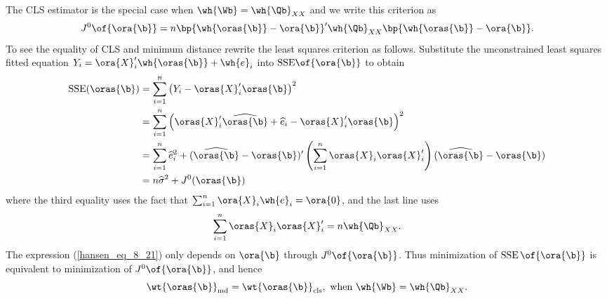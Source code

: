 The CLS estimator is the special case when $\wh{\Wb} = \wh{\Qb}_{XX}$ and we write this criterion as 
\begin{equation}
    \label{hansen_eq_8_20}
    J^0\of{\ora{\b}} = n \bp{\wh{\oras{\b}} - \ora{\b}}^{\prime} \wh{\Qb}_{XX} \bp{\wh{\oras{\b}} - \ora{\b}}.
\end{equation}
To see the equality of CLS and minimum distance rewrite the least squares criterion as follows. Substitute the unconstrained least squares fitted equation $Y_i = \ora{X}_i^{\prime} \wh{\oras{\b}} + \wh{e}_i$ into $\text{SSE}\of{\ora{\b}}$ to obtain 
\begin{equation}
    \label{hansen_eq_8_21}
    \begin{aligned}
        \operatorname{SSE}(\oras{\b}) & =\sum_{i=1}^n\left(Y_i-\oras{X}_i^{\prime} \oras{\b}\right)^2 \\
        & =\sum_{i=1}^n\left(\oras{X}_i^{\prime} \widehat{\oras{\b}}+\widehat{e}_i-\oras{X}_i^{\prime} \oras{\b}\right)^2 \\
        & =\sum_{i=1}^n \widehat{e}_i^2+(\widehat{\oras{\b}}-\oras{\b})^{\prime}\left(\sum_{i=1}^n \oras{X}_i \oras{X}_i^{\prime}\right)(\widehat{\oras{\b}}-\oras{\b}) \\
        & =n \widehat{\sigma}^2+J^0(\oras{\b})
    \end{aligned}
\end{equation}
where the third equality uses the fact that $\sum_{i=1}^{n} \ora{X}_i \wh{e}_i = \ora{0}$, and the last line uses 
\begin{equation}
    \notag 
    \sum_{i=1}^n \oras{X}_i \oras{X}_i^{\prime} = n \wh{\Qb}_{XX}.
\end{equation}
The expression (\ref{hansen_eq_8_21}) only depends on $\ora{\b}$ through $J^0\of{\ora{\b}}$. Thus minimization of $\operatorname{SSE}\of{\ora{\b}}$ is equivalent to minimization of $J^0\of{\ora{\b}}$, and hence 
\begin{equation}
    \notag 
    \wt{\oras{\b}}_{\text{md}} = \wt{\oras{\b}}_{\text{cls}}, \text{  when  } \wh{\Wb} = \wh{\Qb}_{XX}.
\end{equation}

